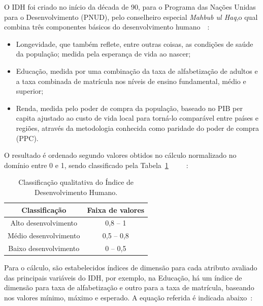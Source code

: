 \documentclass[conference]{IEEEtran}
\begin{document}
O IDH foi criado no início da década de 90, para o Programa das Nações Unidas para o Desenvolvimento (PNUD), pelo conselheiro especial \textit{Mahbub ul Haq},o qual combina três componentes básicos do
desenvolvimento humano~\cite{rezende}~\cite{cesa}:

\begin{itemize}
\item Longevidade, que também reflete, entre outras coisas, as condições de saúde da população; medida pela esperança de vida ao nascer;

\item Educação, medida por uma combinação da taxa de alfabetização de adultos e a taxa combinada de matrícula nos níveis de ensino fundamental, médio e superior;

\item Renda, medida pelo poder de compra da população, baseado no PIB per capita ajustado ao custo de vida local para torná-lo comparável entre países e regiões, através da metodologia conhecida como paridade do poder de compra (PPC).


\end{itemize}

O resultado é ordenado segundo valores obtidos no cálculo normalizado no domínio entre 0 e 1, sendo classificado pela Tabela~\ref{table:classificacao}~\cite{atlas}~\cite{senak}~\cite{espn}~\cite{oxford}~\cite{araujo}:

\begin{table}[!htb]
\centering
\caption{Classificação qualitativa do Índice de Desenvolvimento Humano.}\label{table:classificacao}
\begin{tabular}{c|c}
\hline
\textbf{Classificação} & \textbf{Faixa de valores}\\ 
\hline                               
Alto desenvolvimento & 0,8 -- 1 \\
\hline
Médio desenvolvimento & 0,5 -- 0,8	 \\
\hline
Baixo desenvolvimento & 0 -- 0,5 \\
\hline
\end{tabular}
\end{table}

Para o cálculo, são estabelecidos índices de dimensão para cada atributo avaliado das principais variáveis do IDH, por exemplo, na Educação, há um índice de dimensão para taxa de alfabetização e outro para a taxa de matrícula, baseando nos valores mínimo, máximo e esperado. A equação referida é indicada abaixo~\cite{cesa}: 
\end{document}
